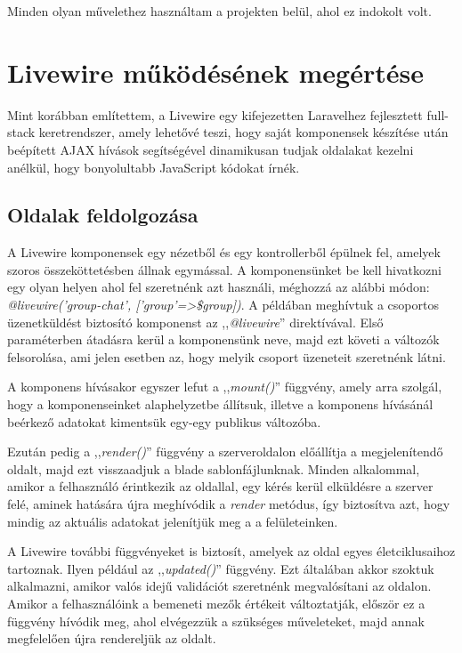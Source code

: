 \documentclass[
]{thesis-ekf}
\theoremstyle{definition}
\theoremstyle{remark}
\begin{document}
                Minden olyan művelethez használtam a projekten belül, ahol ez indokolt volt.

                
            \section{Livewire működésének megértése}\label{Livewire}
                Mint korábban említettem, a Livewire egy kifejezetten Laravelhez fejlesztett full-stack keretrendszer, amely lehetővé teszi, hogy saját komponensek készítése után beépített AJAX hívások segítségével dinamikusan tudjak oldalakat kezelni anélkül, hogy bonyolultabb JavaScript kódokat írnék.
                \subsection{Oldalak feldolgozása}
                A Livewire komponensek egy nézetből és egy kontrollerből épülnek fel, amelyek szoros összeköttetésben állnak egymással. A komponensünket be kell hivatkozni egy olyan helyen ahol fel szeretnénk azt használi, méghozzá az alábbi módon: \emph{@livewire('group-chat', ['group'=>\$group])}. A példában meghívtuk a csoportos üzenetküldést biztosító komponenst az ,,\emph{@livewire}'' direktívával. Első paraméterben átadásra kerül a komponensünk neve, majd ezt követi a változók felsorolása, ami jelen esetben az, hogy melyik csoport üzeneteit szeretnénk látni.

                A komponens hívásakor egyszer lefut a ,,\emph{mount()}'' függvény, amely arra szolgál, hogy a komponenseinket alaphelyzetbe állítsuk, illetve a komponens hívásánál beérkező adatokat kimentsük egy-egy publikus változóba.

                Ezután pedig a ,,\emph{render()}'' függvény a szerveroldalon előállítja a megjelenítendő oldalt, majd ezt visszaadjuk a blade sablonfájlunknak. Minden alkalommal, amikor a felhasználó érintkezik az oldallal, egy kérés kerül elküldésre a szerver felé, aminek hatására újra meghívódik a \emph{render} metódus, így biztosítva azt, hogy mindig az aktuális adatokat jelenítjük meg a a felületeinken.

                A Livewire további függvényeket is biztosít, amelyek az oldal egyes életciklusaihoz tartoznak. Ilyen például az ,,\emph{updated()}'' függvény. Ezt általában akkor szoktuk alkalmazni, amikor valós idejű validációt szeretnénk megvalósítani az oldalon. Amikor a felhasználóink a bemeneti mezők értékeit változtatják, először ez a függvény hívódik meg, ahol elvégezzük a szükséges műveleteket, majd annak megfelelően újra rendereljük az oldalt.
\end{document}
